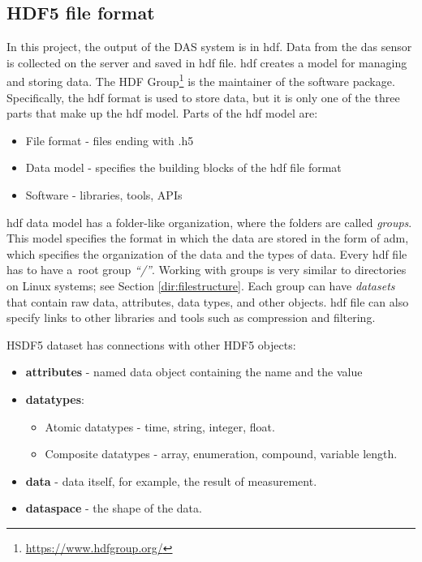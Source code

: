 \subsection{HDF5 file format}

In this project, the output of the DAS system is in \ac{hdf}. Data from the \ac{das} sensor is collected on the server and saved in \ac{hdf} file. \ac{hdf} creates a model for managing and storing data. The HDF Group\footnote{\url{https://www.hdfgroup.org/}} is the maintainer of the software package. Specifically, the \ac{hdf} format is used to store data, but it is only one of the three parts that make up the \ac{hdf} model. Parts of the \ac{hdf} model are:

\begin{itemize}
    \item File format - files ending with .h5
    \item Data model - specifies the building blocks of the \ac{hdf} file format
    \item Software - libraries, tools, APIs
\end{itemize}

\bigskip

\ac{hdf} data model has a folder-like organization, where the folders are called \textit{groups}. This model specifies the format in which the data are stored in the form of \ac{adm}, which specifies the organization of the data and the types of data. Every \ac{hdf} file has to have a~root group \textit{``/''}. Working with groups is very similar to directories on Linux systems; see Section \ref{dir:filestructure}. Each group can have \textit{datasets} that contain raw data, attributes, data types, and other objects. \ac{hdf} file can also specify links to other libraries and tools such as compression and filtering.

\bigskip
HSDF5 dataset has connections with other HDF5 objects:

\begin{itemize}
    \item \textbf{attributes} - named data object containing the name and the value
    \item \textbf{datatypes}:
    \begin{itemize}
        \item Atomic datatypes - time, string, integer, float.
        \item Composite datatypes - array, enumeration, compound, variable length.
    \end{itemize}
    \item \textbf{data} - data itself, for example, the result of measurement.
    \item \textbf{dataspace} - the shape of the data.
\end{itemize}


